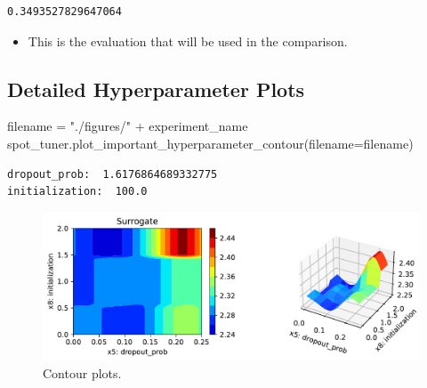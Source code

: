\documentclass[
  letterpaper,
  DIV=11,
  numbers=noendperiod]{scrreprt}
\newenvironment{Shaded}{\begin{snugshade}}{\end{snugshade}}
\newcommand{\NormalTok}[1]{\textcolor[rgb]{0.00,0.23,0.31}{#1}}
\newcommand{\OperatorTok}[1]{\textcolor[rgb]{0.37,0.37,0.37}{#1}}
\newcommand{\StringTok}[1]{\textcolor[rgb]{0.13,0.47,0.30}{#1}}
\providecommand{\tightlist}{%
  \setlength{\itemsep}{0pt}\setlength{\parskip}{0pt}}\usepackage{longtable,booktabs,array}
\begin{document}
\begin{verbatim}
0.3493527829647064
\end{verbatim}

\begin{tcolorbox}[enhanced jigsaw, left=2mm, title=\textcolor{quarto-callout-note-color}{\faInfo}\hspace{0.5em}{Note: Evaluation for the Final Comaprison}, bottomrule=.15mm, titlerule=0mm, breakable, rightrule=.15mm, toprule=.15mm, coltitle=black, colbacktitle=quarto-callout-note-color!10!white, leftrule=.75mm, arc=.35mm, colframe=quarto-callout-note-color-frame, bottomtitle=1mm, colback=white, opacitybacktitle=0.6, toptitle=1mm, opacityback=0]

\begin{itemize}
\tightlist
\item
  This is the evaluation that will be used in the comparison.
\end{itemize}

\end{tcolorbox}

\hypertarget{detailed-hyperparameter-plots-7}{%
\subsection{Detailed Hyperparameter
Plots}\label{detailed-hyperparameter-plots-7}}

\begin{Shaded}
\begin{Highlighting}[]
\NormalTok{filename }\OperatorTok{=} \StringTok{"./figures/"} \OperatorTok{+}\NormalTok{ experiment\_name}
\NormalTok{spot\_tuner.plot\_important\_hyperparameter\_contour(filename}\OperatorTok{=}\NormalTok{filename)}
\end{Highlighting}
\end{Shaded}

\begin{verbatim}
dropout_prob:  1.6176864689332775
initialization:  100.0
\end{verbatim}

\begin{figure}[H]

{\centering \includegraphics{31_spot_lightning_csv_files/figure-pdf/cell-20-output-2.pdf}

}

\caption{Contour plots.}

\end{figure}
\end{document}

